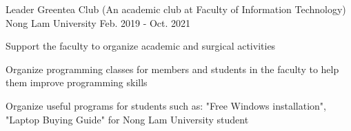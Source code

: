 

\begin{cventries}

  \cventry
    {Leader} %
    {Greentea Club (An academic club at Faculty of Information Technology)} %
    {Nong Lam University} %
    {Feb. 2019 - Oct. 2021} %
    {
      \begin{cvitems} %
        \item {Support the faculty to organize academic and surgical activities}
        \item {Organize programming classes for members and students in the faculty to help them improve programming skills}
        \item {Organize useful programs for students such as: "Free Windows installation", "Laptop Buying Guide" for Nong Lam University student}
      \end{cvitems}
    }

\end{cventries}
